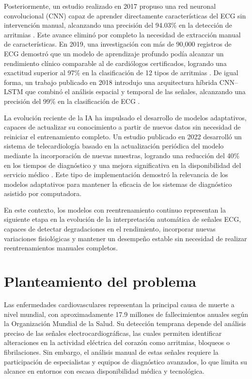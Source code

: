 Posteriormente, un estudio realizado en 2017 propuso una red neuronal convolucional (CNN) capaz de aprender directamente características del ECG sin intervención manual, alcanzando una precisión del 94.03\% en la detección de arritmias \cite{Acharya2017}. Este avance eliminó por completo la necesidad de extracción manual de características. En 2019, una investigación con más de 90,000 registros de ECG demostró que un modelo de aprendizaje profundo podía alcanzar un rendimiento clínico comparable al de cardiólogos certificados, logrando una exactitud superior al 97\% en la clasificación de 12 tipos de arritmias \cite{Hannun2019}. De igual forma, un trabajo publicado en 2018 introdujo una arquitectura híbrida CNN--LSTM que combinó el análisis espacial y temporal de las señales, alcanzando una precisión del 99\% en la clasificación de ECG \cite{AlRahhal2018}.

La evolución reciente de la IA ha impulsado el desarrollo de modelos adaptativos, capaces de actualizar su conocimiento a partir de nuevos datos sin necesidad de reiniciar el entrenamiento completo. Un estudio publicado en 2022 desarrolló un sistema de telecardiología basado en la actualización periódica del modelo mediante la incorporación de nuevas muestras, logrando una reducción del 40\% en los tiempos de diagnóstico y una mejora significativa en la disponibilidad del servicio médico \cite{Reddy2022}. Este tipo de implementación demostró la relevancia de los modelos adaptativos para mantener la eficacia de los sistemas de diagnóstico asistido por computadora.

En este contexto, los modelos con reentrenamiento continuo representan la siguiente etapa en la evolución de la interpretación automática de señales ECG, capaces de detectar degradaciones en el rendimiento, incorporar nuevas variaciones fisiológicas y mantener un desempeño estable sin necesidad de realizar reentrenamientos manuales completos.

\section{Planteamiento del problema}

Las enfermedades cardiovasculares representan la principal causa de muerte a nivel mundial, con aproximadamente 17.9 millones de fallecimientos anuales según la Organización Mundial de la Salud. Su detección temprana depende del análisis preciso de las señales electrocardiográficas, las cuales permiten identificar alteraciones en la actividad eléctrica del corazón como arritmias, bloqueos o fibrilaciones. Sin embargo, el análisis manual de estas señales requiere la participación de especialistas y equipos de diagnóstico avanzados, lo que limita su alcance en entornos con escasa disponibilidad médica y tecnológica.

